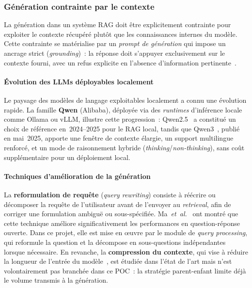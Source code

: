 \documentclass[11pt,a4paper]{article}
\begin{document}
\subsubsection{Génération contrainte par le contexte}

La génération dans un système RAG doit être explicitement contrainte pour exploiter le contexte récupéré plutôt que les connaissances internes du modèle. Cette contrainte se matérialise par un \textit{prompt de génération} qui impose un ancrage strict (\textit{grounding})~: la réponse doit s'appuyer exclusivement sur le contexte fourni, avec un refus explicite en l'absence d'information pertinente~\cite{gao2024ragsurvey}.

\paragraph{Évolution des LLMs déployables localement}

Le paysage des modèles de langage exploitables localement a connu une évolution rapide. La famille \textbf{Qwen} (Alibaba), déployée via des \textit{runtimes} d'inférence locale comme Ollama ou vLLM, illustre cette progression~: Qwen2.5~\cite{qwen2024qwen25} a constitué un choix de référence en~2024--2025 pour le RAG local, tandis que Qwen3~\cite{qwen2025qwen3}, publié en mai~2025, apporte une fenêtre de contexte élargie, un support multilingue renforcé, et un mode de raisonnement hybride (\textit{thinking}/\textit{non-thinking}), sans coût supplémentaire pour un déploiement local.

\paragraph{Techniques d'amélioration de la génération}

La \textbf{reformulation de requête} (\textit{query rewriting}) consiste à réécrire ou décomposer la requête de l'utilisateur avant de l'envoyer au \textit{retrieval}, afin de corriger une formulation ambiguë ou sous-spécifiée. Ma~\textit{et~al.}~\cite{ma2023queryrewriting} ont montré que cette technique améliore significativement les performances en question-réponse ouverte. Dans ce projet, elle est mise en \oe{}uvre par le module de \textit{query processing}, qui reformule la question et la décompose en sous-questions indépendantes lorsque nécessaire. En revanche, la \textbf{compression du contexte}, qui vise à réduire la longueur de l'entrée du modèle~\cite{jiang2023llmlingua,xu2024recomp}, est étudiée dans l'état de l'art mais n'est volontairement pas branchée dans ce POC~: la stratégie parent-enfant limite déjà le volume transmis à la génération.
\end{document}
